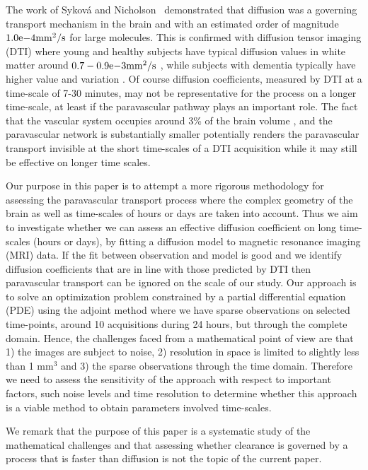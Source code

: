 \documentclass[12pt,a4paper]{article}
\begin{document}
The work of Sykov{\'a} and Nicholson~\cite{sykova2008diffusion} demonstrated
that diffusion was a governing transport mechanism in the brain and with an estimated order of magnitude $1.0\mathrm{e}{-4} \mathrm{mm\sp{2}/s}$ for large molecules. This is confirmed with diffusion tensor imaging (DTI) where young and healthy subjects have typical diffusion values in white matter around $0.7-0.9\mathrm{e}{-3} \mathrm{mm\sp{2}/s}$ \citet{Helenius194},
while subjects with dementia typically have higher value and variation \cite{goujon2018can} . Of course diffusion coefficients, 
measured by DTI at a time-scale of 7-30 minutes, may not be representative for the process on a
longer time-scale, at least if the paravascular pathway plays an important role. The fact that the vascular system occupies around 3\% of the brain volume  \cite{nicholson2001diffusion},
and the paravascular network is substantially smaller potentially renders the paravascular transport  invisible at the short time-scales of a DTI acquisition while it may still be effective on longer time scales. 


Our purpose in this paper is to attempt a more rigorous methodology 
for assessing the paravascular transport process where
the complex geometry of the brain as well as time-scales of hours or days are taken into account.
Thus we aim to investigate whether we can assess an effective diffusion coefficient on long time-scales (hours or days), by fitting a diffusion model to magnetic resonance imaging (MRI) data. If the fit between observation and model is good and we identify diffusion coefficients that are 
in line with those predicted by DTI then paravascular transport can be ignored on the scale of our study. 
Our approach is to solve an optimization problem constrained by a partial differential equation (PDE) using the adjoint method where we have sparse observations on selected time-points, around 10 acquisitions during 24 hours, but through
the complete domain. Hence, the challenges faced from a mathematical point of view 
are that 1) the images are subject to noise, 2) resolution in space is limited to slightly less than 1 $\mathrm{mm}^3$ and 3)
the sparse observations through the time domain. 
Therefore we need to assess the sensitivity of the approach with respect to important factors, such noise levels and time resolution to determine whether this approach is a viable method to obtain parameters involved time-scales. 

We remark that the purpose
of this paper is a systematic study of the mathematical challenges and that assessing  
whether clearance is governed by a process that is faster than diffusion is not the topic of the current paper. 
\end{document}
